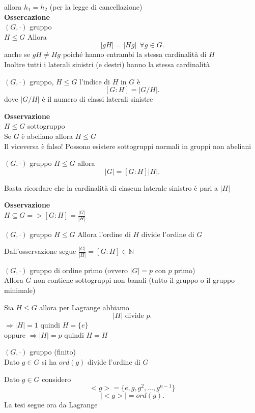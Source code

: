 \documentclass[12px]{article}
\begin{document}
	allora $h_1 = h_2$ (per la legge di cancellazione)\\
	\textbf{Ossercazione}\\
	$(G,\cdot)$ gruppo\\
	$H\leq G$ Allora
	 \[
	|gH| = |Hg| \ \ \forall g\in G
	.\] 
	anche se $gH\neq Hg$ poiché hanno entrambi la stessa cardinalità di  $H$\\
	Inoltre tutti i laterali sinistri (e destri) hanno la stessa cardinalità\\
	 \begin{defi}
		 $(G,\cdot)$ gruppo, $H\leq G$ l'indice di  $H$ in $G$ è 
		  \[
			  [G:H] = |G/H|
		 .\] 
		 dove $|G/H|$ è il numero di classi laterali sinistre
	\end{defi}
	\textbf{Osservazione}\\
	$H\leq G$ sottogruppo\\
	Se  $G$ è abeliano allora  $H\leq G$\\
	Il viceversa è falso! Possono esistere sottogruppi normali in gruppi non abeliani\\
	\begin{prop}
		$(G,\cdot)$ gruppo $H\leq G$ allora
		 \[
			 |G| = [G:H]|H|
		.\] 
	\end{prop}
	\begin{dimo}
		Basta ricordare che la cardinalità di ciascun laterale sinistro è pari a $|H|$
	\end{dimo}
	\textbf{Osservazione}\\
	$\displaystyle H\subseteq G => [G:H] = \frac {|G|}{|H|}$\\
	\begin{teo}[Lagrange]
		$(G,\cdot)$ gruppo $H\leq G$ Allora l'ordine di  $H$ divide l'ordine di  $G$
	\end{teo}
	\begin{dimo}
		Dall'osservazione segue $\displaystyle\frac{|G|}{|H|} = [G:H]\in \mathbb N$
	\end{dimo}
	\begin{coro}
		$(G,\cdot)$ gruppo di ordine primo (ovvero $|G| = p$ con $p$ primo)\\
		Allora $G$ non contiene sottogruppi non banali (tutto il gruppo o il gruppo minimale)
	\end{coro}
	\begin{dimo}
		Sia $H\leq G$ allora per Lagrange abbiamo
		 \[
			 |H| \text{ divide } p
		.\] 
		$ \Rightarrow |H| = 1$ quindi  $H = \lbrace e \rbrace$\\
		oppure 
		$ \Rightarrow |H| = p$ quindi $H=H$

	\end{dimo}
	\begin{coro}
		$(G,\cdot)$ gruppo (finito)\\
		Dato $g\in G $ si ha  $ord(g)$ divide l'ordine di $G$
		
	\end{coro}
	\begin{dimo}
		Dato $g\in G$ considero\\
		\[
			<g> = \lbrace e, g, g^2, \ldots, g^{n-1}\rbrace
		\]
		\[
		|<g>| = ord(g)
		.\] 
		La tesi segue ora da Lagrange
	\end{dimo}
\end{document}
